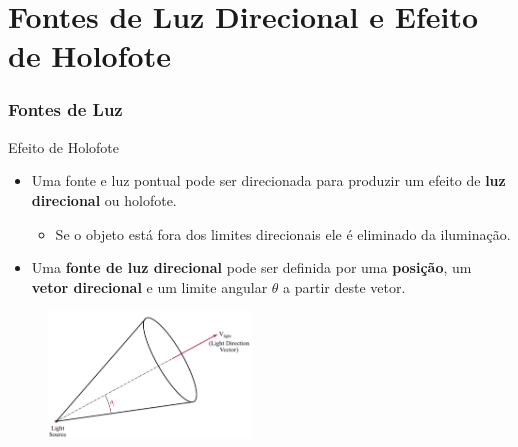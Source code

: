 \documentclass{beamer}
\begin{document}
\section{Fontes de Luz Direcional e Efeito de Holofote}
\begin{frame}
\frametitle{Fontes de Luz}

	\begin{block}{Efeito de Holofote}
		\begin{itemize}
			\item Uma fonte e luz pontual pode ser direcionada para produzir um efeito de \textbf{luz direcional} ou holofote.
			\begin{itemize}
				\item Se o objeto está fora dos limites direcionais ele é eliminado da iluminação.
			\end{itemize}
			\item Uma \textbf{fonte de luz direcional} pode ser definida por uma \textbf{posição}, um \textbf{vetor direcional} e um limite angular $\theta$ a partir deste vetor.				 
		\end{itemize}
	\end{block}

	\begin{figure}[!h]
			\begin{center}
			\includegraphics[width=0.48\textwidth]{Figures/Hol}
			\end{center}
	\end{figure}	
	
\end{frame}


\end{document}
